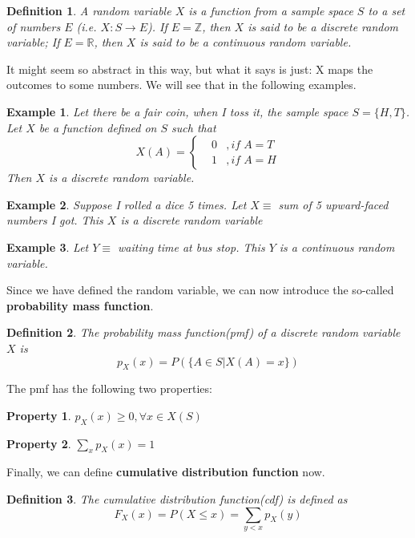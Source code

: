 \documentclass{article}
\newtheorem{definition}{Definition}
\newtheorem{property}{Property}
\newtheorem{ex}{Example}
\begin{document}
\begin{definition}
	A random variable $X$ is a function from a sample space $S$ to a set of numbers $E$ (i.e. $X:S\to E$). If $E=\mathbb{Z}$, then $X$ is said to be a discrete random variable; If $E=\mathbb{R}$, then $X$ is said to be a continuous random variable.
\end{definition}

It might seem so abstract in this way, but what it says is just: X maps the outcomes to some numbers. We will see that in the following examples.
\begin{ex}
	Let there be a fair coin, when I toss it, the sample space $S=\{H,T\}$. Let $X$ be a function defined on $S$ such that
	\[ X(A) = \left\{  \begin{matrix}
	&0 &,if\;A=T\\  &1 &,if\;A=H 
	\end{matrix} \right. \]
	Then $X$ is a discrete random variable. 
\end{ex} 

\begin{ex}
	Suppose I rolled a dice 5 times. Let $X \equiv$ sum of 5 upward-faced numbers I got. This $X$ is a discrete random variable
\end{ex}

\begin{ex}
	Let $Y\equiv$ waiting time at bus stop. This $Y$ is a continuous random variable.
\end{ex}

Since we have defined the random variable, we can now introduce the so-called \textbf{probability mass function}. 
\begin{definition}
	The probability mass function(pmf) of a discrete random variable $X$ is
	\[p_X(x) = P(\{ A\in S| X(A) = x \}) \] 
\end{definition}

The pmf has the following two properties:
\begin{property}
$p_X(x)\geq 0, \forall x\in X(S)$
\end{property}
\begin{property}
	$\sum_x p_X(x) =1$ 
\end{property}


Finally, we can define \textbf{cumulative distribution function} now.
\begin{definition}
	The cumulative distribution function(cdf) is defined as 
	\[ F_X(x) = P(X\leq x) = \sum_{y<x} p_X(y) \]
\end{definition}
\end{document}

